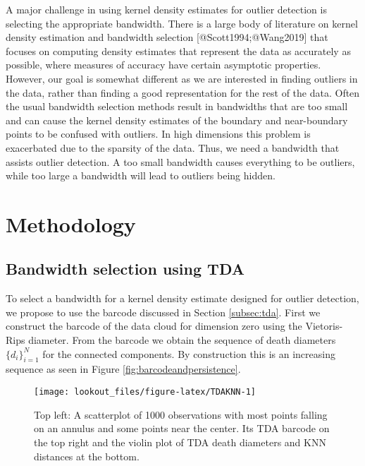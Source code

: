\documentclass[
]{article}
\begin{document}
A major challenge in using kernel density estimates for outlier
detection is selecting the appropriate bandwidth. There is a large body
of literature on kernel density estimation and bandwidth selection
{[}@Scott1994;@Wang2019{]} that focuses on computing density estimates
that represent the data as accurately as possible, where measures of
accuracy have certain asymptotic properties. However, our goal is
somewhat different as we are interested in finding outliers in the data,
rather than finding a good representation for the rest of the data.
Often the usual bandwidth selection methods result in bandwidths that
are too small and can cause the kernel density estimates of the boundary
and near-boundary points to be confused with outliers. In high
dimensions this problem is exacerbated due to the sparsity of the data.
Thus, we need a bandwidth that assists outlier detection. A too small
bandwidth causes everything to be outliers, while too large a bandwidth
will lead to outliers being hidden.

\hypertarget{sec:lookout}{%
\section{Methodology}\label{sec:lookout}}

\hypertarget{subsec:selectingBandwidth}{%
\subsection{Bandwidth selection using
TDA}\label{subsec:selectingBandwidth}}

To select a bandwidth for a kernel density estimate designed for outlier
detection, we propose to use the barcode discussed in Section
\ref{subsec:tda}. First we construct the barcode of the data cloud for
dimension zero using the Vietoris-Rips diameter. From the barcode we
obtain the sequence of death diameters \(\{d_i\}_{i = 1}^N\) for the
connected components. By construction this is an increasing sequence as
seen in Figure \ref{fig:barcodeandpersistence}.

\begin{figure}
\texttt{[image: lookout\_files/figure-latex/TDAKNN-1]} \caption{Top left: A scatterplot of 1000 observations with most points falling on an annulus and some points near the center. Its TDA barcode on the top right and the violin plot of TDA death diameters and KNN distances at the bottom.}\label{fig:TDAKNN}
\end{figure}
\end{document}

